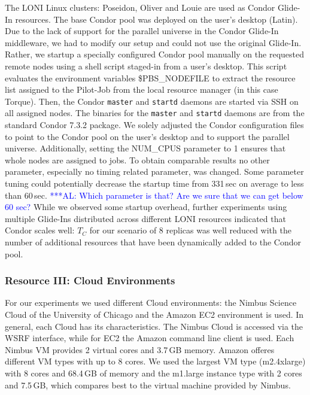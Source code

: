 \documentclass[conference,final]{IEEEtran}
\newcommand{\tc}{$T_{C}$ }
\newcommand{\alnote}[1]{ {\textcolor{blue} { ***AL: #1 }}}
\newcommand{\alnote}[1]{}
\begin{document}
The LONI Linux clusters: Poseidon, Oliver and Louie are used as Condor Glide-In 
resources. The base Condor pool was deployed on the user's desktop
(Latin). Due to the lack of support for the parallel universe in the
Condor Glide-In middleware, we had to modify our setup and could not
use the original Glide-In. Rather, we startup a specially configured 
Condor pool manually on the requested remote nodes using 
a shell script staged-in from a user's desktop. This script evaluates 
the environment variables \$PBS\_NODEFILE to extract the resource list assigned to
the Pilot-Job from the local resource manager (in this case Torque). Then, the 
Condor \texttt{master} and \texttt{startd} daemons are started 
via SSH on all assigned nodes. The binaries for the \texttt{master} and 
\texttt{startd} daemons are from the standard Condor 7.3.2 package. 
We solely adjusted the Condor configuration files to point to the Condor
pool on the user's desktop and to support the parallel universe.
Additionally, setting the NUM\_CPUS parameter to 1 ensures that 
whole nodes are assigned to jobs.
To obtain comparable results no other parameter, especially no timing related parameter, 
was changed. Some parameter tuning could potentially decrease the
startup time from 331\,sec on average to less than 60\,sec. \alnote{Which parameter is that? Are
we sure that we can get below 60 sec?} While we observed
some startup overhead, further experiments using multiple Glide-Ins distributed
across different LONI resources indicated that Condor scales well: \tc for our
scenario of 8 replicas was well reduced with the number of additional resources that have
been dynamically added to the Condor pool. 


\subsubsection*{Resource III: Cloud Environments}

For our experiments we used different Cloud environments: 
the Nimbus Science Cloud of the University of Chicago and the 
Amazon EC2 environment is used. In general, each Cloud has 
its characteristics. The Nimbus Cloud is accessed via the WSRF
interface, while for EC2 the Amazon command line 
client is used. Each Nimbus VM provides 2 virtual cores and 3.7\,GB memory. 
Amazon offeres different VM types with up to 8 cores. We used 
the largest VM type (m2.4xlarge) with 8 cores and 68.4\,GB of memory
and the m1.large instance type with 2 cores and 7.5\,GB, which compares
best to the virtual machine provided by Nimbus. 
\end{document}
